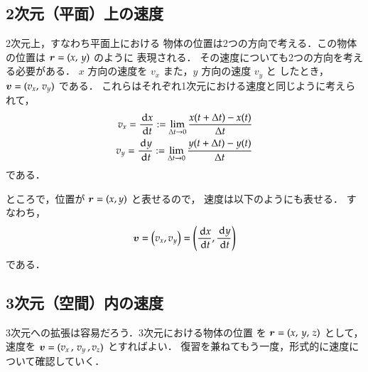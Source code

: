         \subsection{2次元（平面）上の速度}
            2次元上，すなわち平面上における
            物体の位置は2つの方向で考える．この物体の位置は $\boldsymbol{r}=(x,\,y)$ のように
            表現される．    その速度についても2つの方向を考える必要がある．
            $x$ 方向の速度を $v_{x}$ また，$y$ 方向の速度 $v_{y}$ と
            したとき，$\boldsymbol{v}=(v_{x},\,v_{y})$ である．
            これらはそれぞれ1次元における速度と同じように考えられて，
            \begin{align}
                v_{x}=\frac{\,\mathrm{d} x}{\,\mathrm{d} t}:=\lim_{\Delta t \to 0}\frac{x(t+\Delta t)-x(t)}{\Delta t} \notag \\
                v_{y}=\frac{\,\mathrm{d} y}{\,\mathrm{d} t}:=\lim_{\Delta t \to 0}\frac{y(t+\Delta t)-y(t)}{\Delta t}
            \end{align}
            である．

            ところで，位置が $\boldsymbol{r}=(x, y)$ と表せるので，
            速度は以下のようにも表せる．
            すなわち，
                \begin{align}
                    \boldsymbol{v}=\left(v_{x} , v_{y}\right)
                       =\left(
                           \frac{\,\mathrm{d} x}{\,\mathrm{d} t},
                           \frac{\,\mathrm{d} y}{\,\mathrm{d} t}
                        \right)
                \end{align}
            である．


        \subsection{3次元（空間）内の速度}
            3次元への拡張は容易だろう．3次元における物体の位置
            を $\boldsymbol{r}=(x,\,y,\,z)$ として，
            速度を $\boldsymbol{v}=(v_{x}\,,\,v_{y}\,,v_{z})$ とすればよい．
            復習を兼ねてもう一度，形式的に速度について確認していく．

